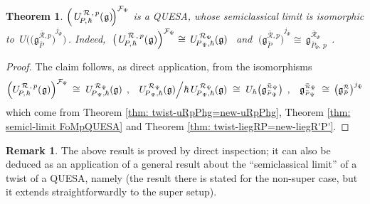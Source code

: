 \documentclass[12pt,reqno,twoside,a4paper]{amsart}
\numberwithin{equation}{section}
\newtheorem{theorem}[lema]{Theorem}
\theoremstyle{definition}
\newtheorem{rmk}[lema]{Remark}
\newtheorem{free text}[lema]{}
\theoremstyle{remark}
\newcommand{\R}{{\mathcal R}}
\newcommand{\F}{{\mathcal F}}
\def \Ppicc {{\scriptscriptstyle P}}
\def \Rpicc {{\scriptscriptstyle \R}}
\def \Psipicc {{\scriptscriptstyle \Psi}}
\def \lieg{\mathfrak{g}}
\def \uRpPhg{U^{\,\R\,,\,p}_{\!P,\hskip0,7pt\hbar}(\hskip0,5pt\lieg)}
\def \pf{\begin{proof}}
\def \epf{\end{proof}}
\theoremstyle{plain}
\begin{document}
\vskip11pt

\begin{theorem}  \label{thm: specializ twisted FoMpQUESA}
%
 $ \Big(\, \uRpPhg \!\Big)^{\F_\Psipicc} $  is a QUESA,
 whose semiclassical limit is isomorphic to
 $ \, U\big( {\big( \lieg^{{\bar{\Rpicc}},p}_{\bar{\Ppicc}} \big)}^{j_{\bar{\Psipicc}}} \big) \, $.
 Indeed,  $ \; \big(\, \uRpPhg \Big)^{\F_\Psipicc} \cong
 \, U_{\!P_{\,\Psipicc},\hbar}^{\,\R_\Psipicc}(\lieg) \;\, $  and
 $ \; {\big( \lieg^{{\bar{\Rpicc}},p}_{\bar{\Ppicc}} \big)}^{j_{\bar{\Psipicc}}} \cong \, \lieg_{\bar{\Ppicc}_\Psipicc,\,p}^{\bar{\Rpicc}_\Psipicc} \;\, $.
%
\end{theorem}

\pf
%
 The claim follows, as direct application, from the isomorphisms
%
  $$  \Big( \uRpPhg \Big)^{\F_\Psipicc}
%
%
 \,\cong\;
%
  U_{\!P_{\,\Psipicc},\hbar}^{\,\R_\Psipicc}(\lieg)  \;\, ,  \!\quad
   U_{\!P_{\,\Psipicc},\hbar}^{\,\R_\Psipicc}(\lieg) \Big/
   \hbar\,U_{\!P_{\,\Psipicc},\hbar}^{\,\R_\Psipicc}(\lieg)
%
%
 \;\cong\;
%
U_\hbar\big(\lieg_{\bar{\Ppicc}_\Psipicc}^{\bar{\Rpicc}_\Psipicc}\big)  \;\, ,  \!\quad
   \lieg_{\bar{\Ppicc}_\Psipicc}^{\bar{\Rpicc}_\Psipicc}
%
 \;\cong\,
%
%
   {\big( \lieg^{\bar{\Rpicc}}_{\bar{\Ppicc}} \big)}^{j_{\bar{\Psipicc}}}  $$
%
 which come from  Theorem \ref{thm: twist-uRpPhg=new-uRpPhg},
 Theorem \ref{thm: semicl-limit FoMpQUESA}  and
 Theorem \ref{thm: twist-liegRP=new-liegR'P'}.
%
\epf

\vskip9pt

\begin{rmk}
%
 The above result is proved by direct inspection;
 it can also be deduced as an application of a general result about
 the ``semiclassical limit'' of a twist of a QUESA, namely
 \cite[Theorem 3.1.2]{GG4}  (the result there is stated for the non-super case,
 but it extends straightforwardly to the super setup).
%
\end{rmk}

\vskip11pt
\end{document}
